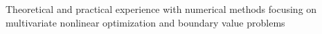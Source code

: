 \item Theoretical and practical experience with numerical methods focusing on multivariate nonlinear optimization and boundary value problems
